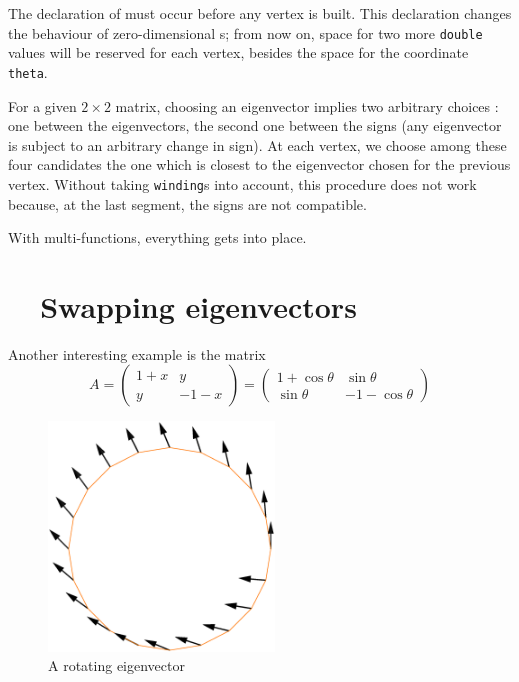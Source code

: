 The declaration of {\small\tt{}} must occur before any vertex is built.
This declaration changes the behaviour of zero-dimensional {\small\tt{}}s;
from now on, space for two more {\small\tt double} values will be reserved for each vertex,
besides the space for the coordinate {\small\tt theta}.

For a given $ 2\times 2 $ matrix, choosing an eigenvector implies two arbitrary choices :
one between the eigenvectors, the second one between the signs
(any eigenvector is subject to an arbitrary change in sign).
At each vertex, we choose among these four candidates
the one which is closest to the eigenvector chosen for the previous vertex.
Without taking {\small\tt winding}s into account, this procedure does not work because,
at the last segment, the signs are not compatible.

With multi-functions, everything gets into place.


\section{~~Swapping eigenvectors}  \label{\numb section 7.\numb parag 27}

Another interesting example is the matrix
$$ A = \left(\begin{array}{cc} 1+x & y \\ y & -1-x \end{array}\right)
= \left(\begin{array}{cc} 1+\cos\theta & \sin\theta \\ \sin\theta & -1-\cos\theta \end{array}\right) $$

\begin{figure}[ht] \centering
  \includegraphics[width=60mm]{circle-conca-swap.eps}
  \caption{A rotating eigenvector}
  \label{\numb section 7.\numb fig 23}
\end{figure}

